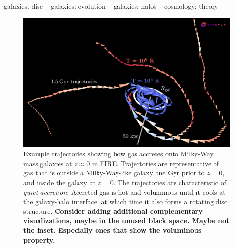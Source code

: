 \documentclass[fleqn,usenatbib]{mnras}
\begin{document}
\begin{keywords}
galaxies: disc -- galaxies: evolution -- galaxies: halos -- cosmology: theory
\end{keywords}



\begin{figure}
    \centering
    \includegraphics[width=\textwidth]{figures/illustrative_tracks/illustrative_tracks.png}
    \caption{
Example trajectories showing how gas accretes onto Milky-Way mass galaxies at $z\approx0$ in FIRE.
Trajectories are representative of gas that is outside a Milky-Way-like galaxy one Gyr prior to $z=0$, and inside the galaxy at $z=0$.
The trajectories are characteristic of \textit{quiet accretion}:
Accreted gas is hot and voluminous until it cools at the galaxy-halo interface, at which time it also forms a rotating disc structure.
\textbf{
Consider adding additional complementary visualizations, maybe in the unused black space.
Maybe not the inset.
Especially ones that show the voluminous property.
    }
    }
    \label{f: overview}
\end{figure}
\end{document}
